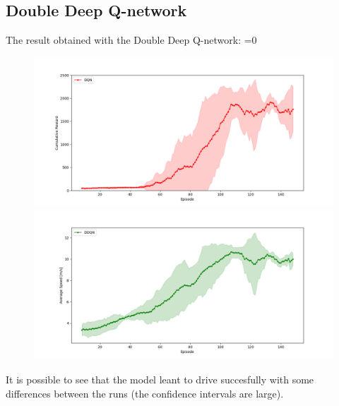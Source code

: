 \documentclass[14pt]{extarticle}
\def\sp{\vspace{5pt}}
\newcounter{debug}
\begin{document}
\begin{flushleft}
\subsection{Double Deep Q-network}
\sp
The result obtained with the Double Deep Q-network:
\vspace{-5mm}
\ifnum\value{debug}=0 {
	\begin{figure}[H]
    		\centering\includegraphics[width=1\textwidth]{./Image/Results/DD/plot1_reward.png}
    		\vspace{-5mm}
    		\centering\includegraphics[width=1\textwidth]{./Image/Results/DD/plot1_speed.png}
	\end{figure}
	}\fi
	It is possible to see that the model leant to drive succesfully with some differences between the runs (the confidence intervals are large).
	

\end{flushleft}
\end{document}
